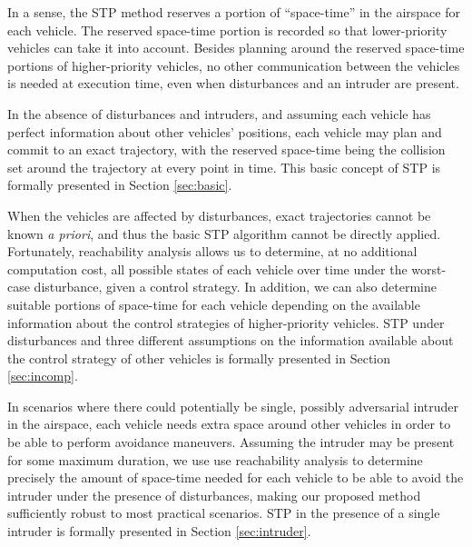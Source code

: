In a sense, the STP method reserves a portion of ``space-time'' in the airspace for each vehicle. The reserved space-time portion is recorded so that lower-priority vehicles can take it into account. Besides planning around the reserved space-time portions of higher-priority vehicles, no other communication between the vehicles is needed at execution time, even when disturbances and an intruder are present. 


In the absence of disturbances and intruders, and assuming each vehicle has perfect information about other vehicles' positions, each vehicle may plan and commit to an exact trajectory, with the reserved space-time being the collision set around the trajectory at every point in time. This basic concept of STP is formally presented in Section \ref{sec:basic}.

When the vehicles are affected by disturbances, exact trajectories cannot be known \textit{a priori}, and thus the basic STP algorithm cannot be directly applied. Fortunately, reachability analysis allows us to determine, at no additional computation cost, all possible states of each vehicle over time under the worst-case disturbance, given a control strategy. In addition, we can also determine suitable portions of space-time for each vehicle depending on the available information about the control strategies of higher-priority vehicles. STP under disturbances and three different assumptions on the information available about the control strategy of other vehicles is formally presented in Section \ref{sec:incomp}.

In scenarios where there could potentially be single, possibly adversarial intruder in the airspace, each vehicle needs extra space around other vehicles in order to be able to perform avoidance maneuvers. Assuming the intruder may be present for some maximum duration, we use use reachability analysis to determine precisely the amount of space-time needed for each vehicle to be able to avoid the intruder under the presence of disturbances, making our proposed method sufficiently robust to most practical scenarios. STP in the presence of a single intruder is formally presented in Section \ref{sec:intruder}.
